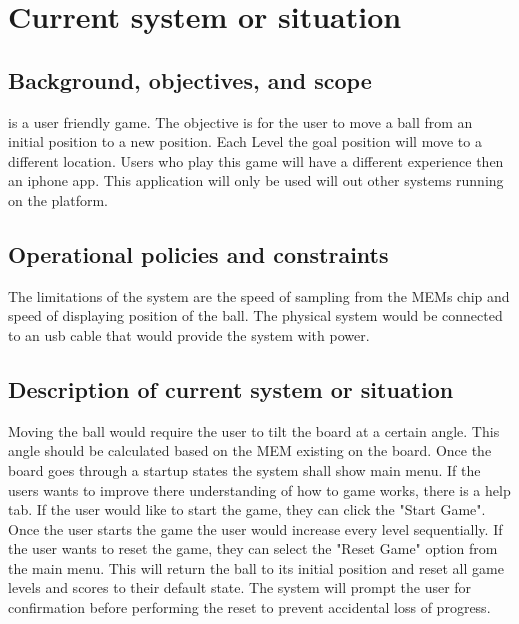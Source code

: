 
\chapter{Current system or situation}
\label{loc:Current System or Situation}


\section{Background, objectives, and scope}
\label{loc:Background, Objectives, and Scope}


\ThisSystem is a user friendly game. The objective is for the user to move a ball from an initial position to a new position. 
Each Level the goal position will move to a different location. Users who play this game will have a different experience then an iphone app.
This application will only be used will out other systems running on the platform.

\section{Operational policies and constraints}
\label{loc:Operational Policies and Constraints}


The limitations of the system are the speed of sampling from the MEMs chip and speed of displaying position of the ball.
The physical system would be connected to an usb cable that would provide the system with power.

\section{Description of current system or situation}
\label{loc:Description of current system or situation}


Moving the ball would require the user to tilt the board at a certain angle. This angle should be calculated based on the MEM existing on the board.
Once the board goes through a startup states the system shall show main menu. If the users wants to improve there understanding of how to game works, there is a help tab.
If the user would like to start the game, they can click the "Start Game". Once the user starts the game the user would increase every level sequentially.
If the user wants to reset the game, they can select the "Reset Game" option from the main menu. This will return the ball to its initial position and reset all game levels and scores to their default state. 
The system will prompt the user for confirmation before performing the reset to prevent accidental loss of progress.

